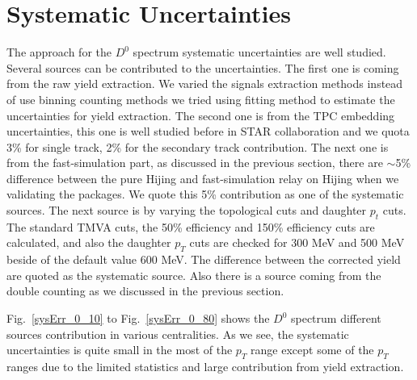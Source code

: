 \clearpage

\section{\label{systematic}Systematic Uncertainties}

The approach for the $D^0$ spectrum systematic uncertainties are well studied. Several sources can be contributed to the uncertainties. The first one is coming from the raw yield extraction. We varied the signals extraction methods instead of use binning counting methods we tried using fitting method to estimate the uncertainties for yield extraction. The second one is from the TPC embedding uncertainties, this one is well studied before in STAR collaboration and we quota 3\% for single track, 2\% for the secondary track contribution. The next one is from the fast-simulation part, as discussed in the previous section, there are $\sim$5\% difference between the pure Hijing and fast-simulation relay on Hijing when we validating the packages. We quote this 5\% contribution as one of the systematic sources.
The next source is by varying the topological cuts and daughter $p_t$ cuts. The standard TMVA cuts, the 50\% efficiency and 150\% efficiency cuts are calculated, and also the daughter $p_T$ cuts are checked for 300 MeV and 500 MeV beside of the default value 600 MeV. The difference between the corrected yield are quoted as the systematic source. Also there is a source coming from the double counting as we discussed in the previous section.

Fig.~\ref{sysErr_0_10} to Fig.~\ref{sysErr_0_80} shows the $D^0$ spectrum different sources contribution in various centralities. As we see, the systematic uncertainties is quite small in the most of the $p_T$ range except some of the $p_T$ ranges due to the limited statistics and large contribution from yield extraction.


